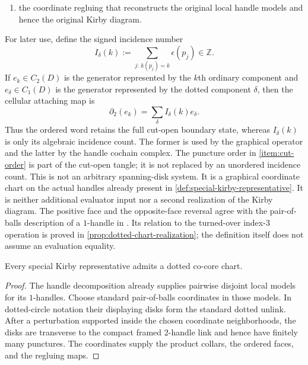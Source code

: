 \begin{definition}
\begin{enumerate}[label=(\roman*),ref=\roman*]
  \item\label{item:cut-regluing}
  the coordinate regluing that reconstructs the original local handle models
  and hence the original Kirby diagram.
\end{enumerate}
For later use, define the signed incidence number
\[
  I_\delta(k)
  :=\sum_{j:\,k(p_j)=k}\epsilon(p_j)\in\mathbb Z.
  \tag{2.1}\label{eq:dotted-incidence-number}
\]
If $e_k\in C_2(D)$ is the generator represented by the $k$th ordinary
component and $e_\delta\in C_1(D)$ is the generator represented by the
dotted component $\delta$, then the cellular attaching map is
\[
  \partial_2(e_k)=\sum_\delta I_\delta(k)e_\delta.
  \tag{2.2}\label{eq:dotted-cellular-boundary}
\]
Thus the ordered word retains the full cut-open boundary state, whereas
$I_\delta(k)$ is only its algebraic incidence count.  The former is used by
the graphical operator and the latter by the handle cochain complex.
The puncture order in \cref{item:cut-order} is part of the cut-open tangle;
it is not replaced by an unordered incidence count.
This is not an arbitrary spanning-disk system.  It is a graphical coordinate
chart on the actual handles already present in
\cref{def:special-kirby-representative}.  It is neither additional evaluator
input nor a second realization of the Kirby diagram.
The positive face and the opposite-face reversal agree with the pair-of-balls
description of a $1$-handle in
\cite[Section~2.3.2 and Definition~4.12]{BarenzBarrett2018}.  Its relation to
the turned-over index-$3$ operation is proved in
\cref{prop:dotted-chart-realization}; the definition itself does not assume an
evaluation equality.
\end{definition}

\begin{lemma}
\label{lem:dotted-cut-presentation-existence}
Every special Kirby representative admits a dotted co-core chart.
\end{lemma}

\begin{proof}
The handle decomposition already supplies pairwise disjoint local models for
its $1$-handles.  Choose standard pair-of-balls coordinates in those models.
In dotted-circle notation their displaying disks form the standard dotted
unlink.  After a perturbation supported inside the chosen coordinate
neighborhoods, the disks are transverse to the compact framed $2$-handle link
and hence have finitely many punctures.  The coordinates supply the product
collars, the ordered faces, and the regluing maps.
\end{proof}

